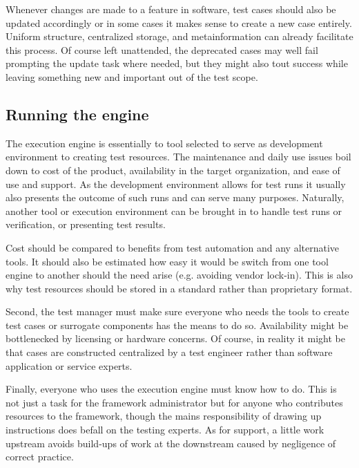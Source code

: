 \documentclass[12pt,a4paper,oneside,pdftex]{report}
\begin{document}
Whenever changes are made to a feature in software, test cases should also be updated accordingly or in some cases it makes sense to create a new case entirely. Uniform structure, centralized storage, and metainformation can already facilitate this process. Of course left unattended, the deprecated cases may well fail prompting the update task where needed, but they might also tout success while leaving something new and important out of the test scope.




\subsection{Running the engine}

The execution engine is essentially to tool selected to serve as development environment to creating test resources. The maintenance and daily use issues boil down to cost of the product, availability in the target organization, and ease of use and support. As the development environment allows for test runs it usually also presents the outcome of such runs and can serve many purposes. Naturally, another tool or execution environment can be brought in to handle test runs or verification, or presenting test results.

Cost should be compared to benefits from test automation and any alternative tools. It should also be estimated how easy it would be switch from one tool engine to another should the need arise (e.g. avoiding vendor lock-in). This is also why test resources should be stored in a standard rather than proprietary format.

Second, the test manager must make sure everyone who needs the tools to create test cases or surrogate components has the means to do so. Availability might be bottlenecked by licensing or hardware concerns. Of course, in reality it might be that cases are constructed centralized by a test engineer rather than software application or service experts.

Finally, everyone who uses the execution engine must know how to do. This is not just a task for the framework administrator but for anyone who contributes resources to the framework, though the mains responsibility of drawing up instructions does befall on the testing experts. As for support, a little work upstream avoids build-ups of work at the downstream caused by negligence of correct practice.
\end{document}
